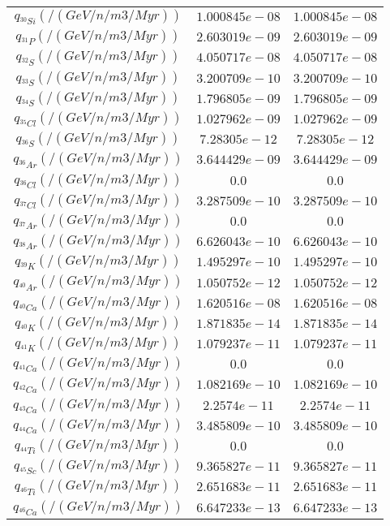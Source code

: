 \begin{tabular}{c |c |c}
	$q_{^{30}Si} (/(GeV/n/m3/Myr))$ & $1.000845e-08$ &$1.000845e-08$ \\ 
	$q_{^{31}P} (/(GeV/n/m3/Myr))$ & $2.603019e-09$ &$2.603019e-09$ \\ 
	$q_{^{32}S} (/(GeV/n/m3/Myr))$ & $4.050717e-08$ &$4.050717e-08$ \\ 
	$q_{^{33}S} (/(GeV/n/m3/Myr))$ & $3.200709e-10$ &$3.200709e-10$ \\ 
	$q_{^{34}S} (/(GeV/n/m3/Myr))$ & $1.796805e-09$ &$1.796805e-09$ \\ 
	$q_{^{35}Cl} (/(GeV/n/m3/Myr))$ & $1.027962e-09$ &$1.027962e-09$ \\ 
	$q_{^{36}S} (/(GeV/n/m3/Myr))$ & $7.28305e-12$ &$7.28305e-12$ \\ 
	$q_{^{36}Ar} (/(GeV/n/m3/Myr))$ & $3.644429e-09$ &$3.644429e-09$ \\ 
	$q_{^{36}Cl} (/(GeV/n/m3/Myr))$ & $0.0$ &$0.0$ \\ 
	$q_{^{37}Cl} (/(GeV/n/m3/Myr))$ & $3.287509e-10$ &$3.287509e-10$ \\ 
	$q_{^{37}Ar} (/(GeV/n/m3/Myr))$ & $0.0$ &$0.0$ \\ 
	$q_{^{38}Ar} (/(GeV/n/m3/Myr))$ & $6.626043e-10$ &$6.626043e-10$ \\ 
	$q_{^{39}K} (/(GeV/n/m3/Myr))$ & $1.495297e-10$ &$1.495297e-10$ \\ 
	$q_{^{40}Ar} (/(GeV/n/m3/Myr))$ & $1.050752e-12$ &$1.050752e-12$ \\ 
	$q_{^{40}Ca} (/(GeV/n/m3/Myr))$ & $1.620516e-08$ &$1.620516e-08$ \\ 
	$q_{^{40}K} (/(GeV/n/m3/Myr))$ & $1.871835e-14$ &$1.871835e-14$ \\ 
	$q_{^{41}K} (/(GeV/n/m3/Myr))$ & $1.079237e-11$ &$1.079237e-11$ \\ 
	$q_{^{41}Ca} (/(GeV/n/m3/Myr))$ & $0.0$ &$0.0$ \\ 
	$q_{^{42}Ca} (/(GeV/n/m3/Myr))$ & $1.082169e-10$ &$1.082169e-10$ \\ 
	$q_{^{43}Ca} (/(GeV/n/m3/Myr))$ & $2.2574e-11$ &$2.2574e-11$ \\ 
	$q_{^{44}Ca} (/(GeV/n/m3/Myr))$ & $3.485809e-10$ &$3.485809e-10$ \\ 
	$q_{^{44}Ti} (/(GeV/n/m3/Myr))$ & $0.0$ &$0.0$ \\ 
	$q_{^{45}Sc} (/(GeV/n/m3/Myr))$ & $9.365827e-11$ &$9.365827e-11$ \\ 
	$q_{^{46}Ti} (/(GeV/n/m3/Myr))$ & $2.651683e-11$ &$2.651683e-11$ \\ 
	$q_{^{46}Ca} (/(GeV/n/m3/Myr))$ & $6.647233e-13$ &$6.647233e-13$ \\ 

\end{tabular}
